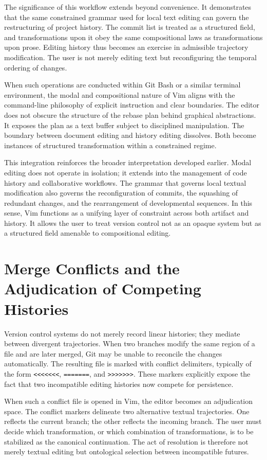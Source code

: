 \documentclass[12pt]{article}
\begin{document}
The significance of this workflow extends beyond convenience. It demonstrates that the same constrained grammar used for local text editing can govern the restructuring of project history. The commit list is treated as a structured field, and transformations upon it obey the same compositional laws as transformations upon prose. Editing history thus becomes an exercise in admissible trajectory modification. The user is not merely editing text but reconfiguring the temporal ordering of changes.

When such operations are conducted within Git Bash or a similar terminal environment, the modal and compositional nature of Vim aligns with the command-line philosophy of explicit instruction and clear boundaries. The editor does not obscure the structure of the rebase plan behind graphical abstractions. It exposes the plan as a text buffer subject to disciplined manipulation. The boundary between document editing and history editing dissolves. Both become instances of structured transformation within a constrained regime.

This integration reinforces the broader interpretation developed earlier. Modal editing does not operate in isolation; it extends into the management of code history and collaborative workflows. The grammar that governs local textual modification also governs the reconfiguration of commits, the squashing of redundant changes, and the rearrangement of developmental sequences. In this sense, Vim functions as a unifying layer of constraint across both artifact and history. It allows the user to treat version control not as an opaque system but as a structured field amenable to compositional editing.

\section{Merge Conflicts and the Adjudication of Competing Histories}

Version control systems do not merely record linear histories; they mediate between divergent trajectories. When two branches modify the same region of a file and are later merged, Git may be unable to reconcile the changes automatically. The resulting file is marked with conflict delimiters, typically of the form \texttt{<<<<<<<}, \texttt{=======}, and \texttt{>>>>>>>}. These markers explicitly expose the fact that two incompatible editing histories now compete for persistence.

When such a conflict file is opened in Vim, the editor becomes an adjudication space. The conflict markers delineate two alternative textual trajectories. One reflects the current branch; the other reflects the incoming branch. The user must decide which transformation, or which combination of transformations, is to be stabilized as the canonical continuation. The act of resolution is therefore not merely textual editing but ontological selection between incompatible futures.
\end{document}
